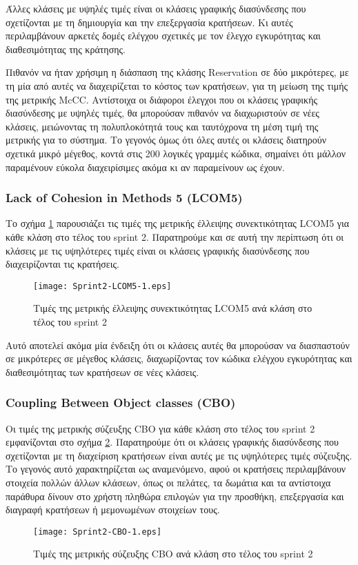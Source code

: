 Άλλες κλάσεις με υψηλές τιμές είναι οι κλάσεις γραφικής διασύνδεσης που
σχετίζονται με τη δημιουργία και την επεξεργασία κρατήσεων. Κι αυτές
περιλαμβάνουν αρκετές δομές ελέγχου σχετικές με τον έλεγχο εγκυρότητας
και διαθεσιμότητας της κράτησης.

Πιθανόν να ήταν χρήσιμη η διάσπαση της κλάσης Reservation σε δύο
μικρότερες, με τη μία από αυτές να διαχειρίζεται το κόστος των κρατήσεων,
για τη μείωση της τιμής της μετρικής McCC. Αντίστοιχα οι διάφοροι
έλεγχοι που οι κλάσεις γραφικής διασύνδεσης με υψηλές τιμές, θα
μπορούσαν πιθανόν να διαχωριστούν σε νέες κλάσεις, μειώνοντας τη
πολυπλοκότητά τους και ταυτόχρονα τη μέση τιμή της μετρικής για το
σύστημα. Το γεγονός όμως ότι όλες αυτές οι κλάσεις διατηρούν σχετικά
μικρό μέγεθος, κοντά στις 200 λογικές γραμμές κώδικα, σημαίνει ότι
μάλλον παραμένουν εύκολα διαχειρίσιμες ακόμα κι αν παραμείνουν ως έχουν.

\subsubsection{Lack of Cohesion in Methods 5 (LCOM5)}
\label{section:sprint2LCOM5}

Το σχήμα \ref{fig:sprint2LCOM5} παρουσιάζει τις τιμές της μετρικής
έλλειψης συνεκτικότητας LCOM5 για κάθε κλάση στο τέλος του sprint 2.
Παρατηρούμε και σε αυτή την περίπτωση ότι οι κλάσεις με τις υψηλότερες
τιμές είναι οι κλάσεις γραφικής διασύνδεσης που διαχειρίζονται τις
κρατήσεις.

\begin{figure}
\centering
\texttt{[image: Sprint2-LCOM5-1.eps]}
\caption{Τιμές της μετρικής έλλειψης συνεκτικότητας LCOM5 ανά κλάση στο τέλος του sprint 2}
\label{fig:sprint2LCOM5}
\end{figure}

Αυτό αποτελεί ακόμα μία ένδειξη ότι οι κλάσεις αυτές θα
μπορούσαν να διασπαστούν σε μικρότερες σε μέγεθος κλάσεις, διαχωρίζοντας
τον κώδικα ελέγχου εγκυρότητας και διαθεσιμότητας των κρατήσεων σε
νέες κλάσεις.

\subsubsection{Coupling Between Object classes (CBO)}
\label{section:sprint2CBO}

Οι τιμές της μετρικής σύζευξης CBO για κάθε κλάση στο τέλος του sprint 2
εμφανίζονται στο σχήμα \ref{fig:sprint2CBO}. Παρατηρούμε ότι οι κλάσεις
γραφικής διασύνδεσης που σχετίζονται με τη διαχείριση κρατήσεων είναι
αυτές με τις υψηλότερες τιμές σύζευξης. Το γεγονός αυτό χαρακτηρίζεται
ως αναμενόμενο, αφού οι κρατήσεις περιλαμβάνουν στοιχεία πολλών άλλων
κλάσεων, όπως οι πελάτες, τα δωμάτια και τα αντίστοιχα παράθυρα δίνουν
στο χρήστη πληθώρα επιλογών για την προσθήκη, επεξεργασία και διαγραφή
κρατήσεων ή μεμονωμένων στοιχείων τους.

\begin{figure}
\centering
\texttt{[image: Sprint2-CBO-1.eps]}
\caption{Τιμές της μετρικής σύζευξης CBO ανά κλάση στο τέλος του sprint 2}
\label{fig:sprint2CBO}
\end{figure}
